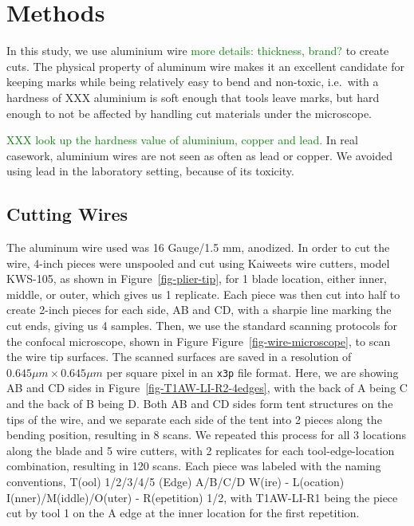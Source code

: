\documentclass[fleqn,10pt]{wlscirep}
\newcommand{\hh}[1]{{\textcolor{Green}{#1}}}
\begin{document}
\section*{Methods}\label{sec-methods}

In this study, we use aluminium wire
\hh{more details: thickness, brand?} to create cuts. The physical
property of aluminum wire makes it an excellent candidate for keeping
marks while being relatively easy to bend and non-toxic, i.e.~with a
hardness of XXX aluminium is soft enough that tools leave marks, but
hard enough to not be affected by handling cut materials under the
microscope.

\hh{XXX look up the hardness value of aluminium, copper and lead. } In
real casework, aluminium wires are not seen as often as lead or copper.
We avoided using lead in the laboratory setting, because of its
toxicity.

\subsection*{Cutting Wires}\label{sec-cutting-wires}

The aluminum wire used was 16 Gauge/1.5 mm, anodized. In order to cut
the wire, 4-inch pieces were unspooled and cut using Kaiweets wire
cutters, model KWS-105, as shown in Figure~\ref{fig-plier-tip}, for 1
blade location, either inner, middle, or outer, which gives us 1
replicate. Each piece was then cut into half to create 2-inch pieces for
each side, AB and CD, with a sharpie line marking the cut ends, giving
us 4 samples. Then, we use the standard scanning protocols for the
confocal microscope, shown in Figure Figure~\ref{fig-wire-microscope},
to scan the wire tip surfaces. The scanned surfaces are saved in a
resolution of \(0.645 \mu m \times 0.645 \mu m\) per square pixel in an
\texttt{x3p} file format. Here, we are showing AB and CD sides in
Figure~\ref{fig-T1AW-LI-R2-4edges}, with the back of A being C and the
back of B being D. Both AB and CD sides form tent structures on the tips
of the wire, and we separate each side of the tent into 2 pieces along
the bending position, resulting in 8 scans. We repeated this process for
all 3 locations along the blade and 5 wire cutters, with 2 replicates
for each tool-edge-location combination, resulting in 120 scans. Each
piece was labeled with the naming conventions, T(ool) 1/2/3/4/5 (Edge)
A/B/C/D W(ire) - L(ocation) I(nner)/M(iddle)/O(uter) - R(epetition) 1/2,
with T1AW-LI-R1 being the piece cut by tool 1 on the A edge at the inner
location for the first repetition.
\end{document}
